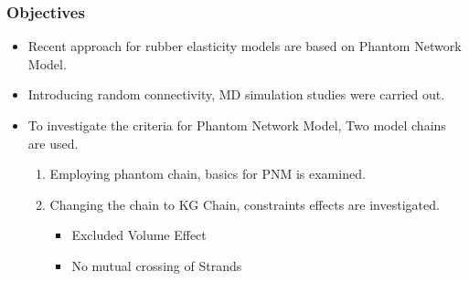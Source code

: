 \documentclass[12pt, dvipdfmx]{beamer}
\begin{document}
\begin{frame}
\end{frame}

\begin{frame}
	\frametitle{Objectives}

	\begin{itemize}
		\item Recent approach for rubber elasticity models are based on Phantom Network Model.
		\item Introducing random connectivity, MD simulation studies were carried out.
		\item To investigate the criteria for Phantom Network Model, Two model chains are used.
		\begin{enumerate}
			\item Employing phantom chain, basics for PNM is examined.
			\item Changing the chain to KG Chain, constraints effects are investigated.
			\begin{itemize}
				\item Excluded Volume Effect
				\item No mutual crossing of Strands
			\end{itemize}
		\end{enumerate}
	\end{itemize}


\end{frame}
\end{document}
